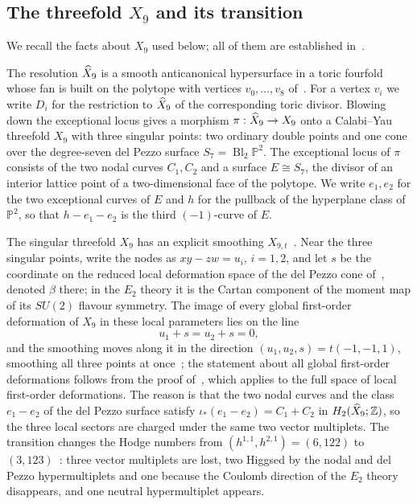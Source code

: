 \subsection{The threefold \texorpdfstring{$X_9$}{X9} and its transition}
\label{subsec:x9}

We recall the facts about $X_9$ used below; all of them are established
in~\cite{W26global,W26quantum}.

The resolution $\widehat X_9$ is a smooth anticanonical hypersurface in a toric fourfold whose fan is
built on the polytope with vertices $v_0,\dots,v_8$ of~\cite[eq.~(3.1)]{W26quantum}. For a vertex $v_i$ we write $D_i$ for the
restriction to $\widehat X_9$ of the corresponding toric divisor. Blowing down the exceptional
locus gives a morphism $\pi:\widehat X_9\to X_9$ onto a Calabi--Yau threefold $X_9$ with three
singular points: two ordinary double points and one cone over the degree-seven del Pezzo surface
$S_7=\operatorname{Bl}_2\mathbb P^2$. The exceptional locus of $\pi$ consists of the two nodal
curves $C_1,C_2$ and a surface $E\cong S_7$, the divisor of an interior lattice point of a
two-dimensional face of the polytope. We write $e_1,e_2$ for the two exceptional curves of $E$
and $h$ for the pullback of the hyperplane class of $\mathbb P^2$, so that $h-e_1-e_2$ is the
third $(-1)$-curve of $E$.

The singular threefold $X_9$ has an explicit smoothing $X_{9,t}$~\cite[Sect.~3.1]{W26quantum}.
Near the three singular points, write the nodes as $xy-zw=u_i$, $i=1,2$, and let $s$ be the
coordinate on the reduced local deformation space of the del Pezzo cone
of~\cite[eqs.~(2.2), (2.3)]{W26quantum}, denoted $\beta$ there; in the $E_2$ theory it is the
Cartan component of the moment map of its $SU(2)$ flavour symmetry. The image of every global
first-order deformation of $X_9$ in these local parameters lies on the line
\begin{equation}
 u_1+s=u_2+s=0,
 \label{eq:x9-line}
\end{equation}
and the smoothing moves along it in the direction $(u_1,u_2,s)=t(-1,-1,1)$, smoothing all
three points at once~\cite[eqs.~(3.4), (3.9)]{W26quantum}; the statement about all global
first-order deformations follows from the proof of~\cite[Thm.~2.2]{W26quantum}, which applies to
the full space of local first-order deformations. The reason is that the two nodal curves and the
class $e_1-e_2$ of the del Pezzo surface satisfy $\iota_*(e_1-e_2)=C_1+C_2$ in
$H_2(\widehat X_9;\mathbb Z)$, so the three local sectors are charged under the same two vector
multiplets. The transition changes the Hodge numbers from $(h^{1,1},h^{2,1})=(6,122)$ to
$(3,123)$~\cite[eqs.~(1.2), (3.5)]{W26quantum}: three vector multiplets are lost, two Higgsed by
the nodal and del Pezzo hypermultiplets and one because the Coulomb direction of the $E_2$ theory
disappears, and one neutral hypermultiplet appears.


